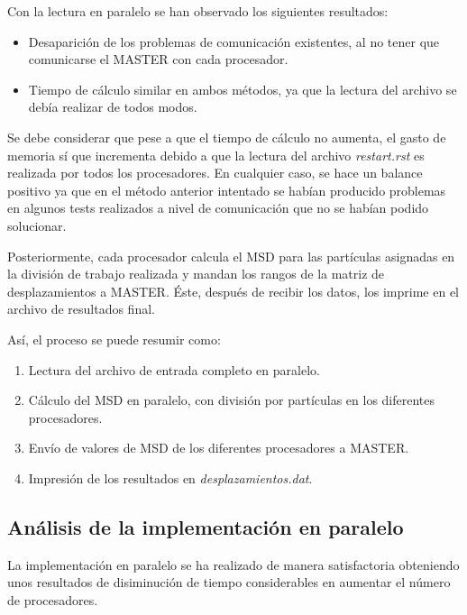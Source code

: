 \documentclass[onecolumn]{article}
\renewcommand{\it}[1]{\textit{#1}}
\begin{document}
Con la lectura en paralelo se han observado los siguientes resultados:
\begin{itemize}
\item Desaparición de los problemas de comunicación existentes, al no tener que comunicarse el MASTER con cada procesador.
\item Tiempo de cálculo similar en ambos métodos, ya que la lectura del archivo se debía realizar de todos modos.
\end{itemize}
Se debe considerar que pese a que el tiempo de cálculo no aumenta, el gasto de memoria sí que incrementa debido a que la lectura del archivo \it{restart.rst} es realizada por todos los procesadores. En cualquier caso, se hace un balance positivo ya que en el método anterior intentado se habían producido problemas en algunos tests realizados a nivel de comunicación que no se habían podido solucionar.

Posteriormente, cada procesador calcula el MSD para las partículas asignadas en la división de trabajo realizada y mandan los rangos de la matriz de desplazamientos a MASTER. Éste, después de recibir los datos, los imprime en el archivo de resultados final.

Así, el proceso se puede resumir como:
\begin{enumerate}
\item Lectura del archivo de entrada completo en paralelo.
\item Cálculo del MSD en paralelo, con división por partículas en los diferentes procesadores.
\item Envío de valores de MSD de los diferentes procesadores a MASTER.
\item Impresión de los resultados en \it{desplazamientos.dat}.
\end{enumerate}

\subsection{Análisis de la implementación en paralelo}
La implementación en paralelo se ha realizado de manera satisfactoria obteniendo unos resultados de disiminución de tiempo considerables en aumentar el número de procesadores.
\end{document}
